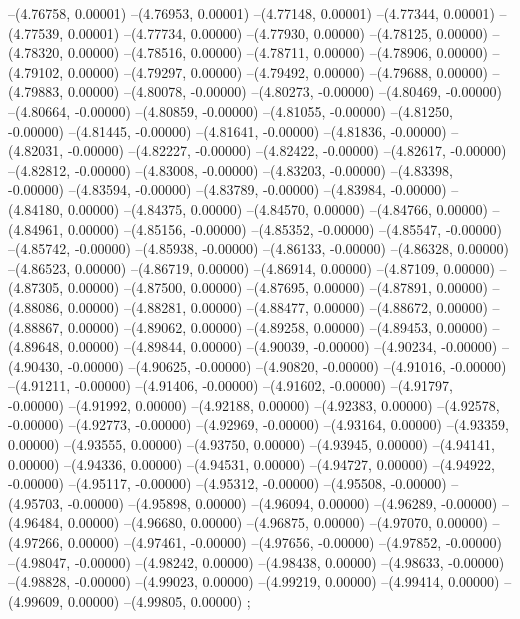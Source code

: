 --(4.76758, 0.00001)
--(4.76953, 0.00001)
--(4.77148, 0.00001)
--(4.77344, 0.00001)
--(4.77539, 0.00001)
--(4.77734, 0.00000)
--(4.77930, 0.00000)
--(4.78125, 0.00000)
--(4.78320, 0.00000)
--(4.78516, 0.00000)
--(4.78711, 0.00000)
--(4.78906, 0.00000)
--(4.79102, 0.00000)
--(4.79297, 0.00000)
--(4.79492, 0.00000)
--(4.79688, 0.00000)
--(4.79883, 0.00000)
--(4.80078, -0.00000)
--(4.80273, -0.00000)
--(4.80469, -0.00000)
--(4.80664, -0.00000)
--(4.80859, -0.00000)
--(4.81055, -0.00000)
--(4.81250, -0.00000)
--(4.81445, -0.00000)
--(4.81641, -0.00000)
--(4.81836, -0.00000)
--(4.82031, -0.00000)
--(4.82227, -0.00000)
--(4.82422, -0.00000)
--(4.82617, -0.00000)
--(4.82812, -0.00000)
--(4.83008, -0.00000)
--(4.83203, -0.00000)
--(4.83398, -0.00000)
--(4.83594, -0.00000)
--(4.83789, -0.00000)
--(4.83984, -0.00000)
--(4.84180, 0.00000)
--(4.84375, 0.00000)
--(4.84570, 0.00000)
--(4.84766, 0.00000)
--(4.84961, 0.00000)
--(4.85156, -0.00000)
--(4.85352, -0.00000)
--(4.85547, -0.00000)
--(4.85742, -0.00000)
--(4.85938, -0.00000)
--(4.86133, -0.00000)
--(4.86328, 0.00000)
--(4.86523, 0.00000)
--(4.86719, 0.00000)
--(4.86914, 0.00000)
--(4.87109, 0.00000)
--(4.87305, 0.00000)
--(4.87500, 0.00000)
--(4.87695, 0.00000)
--(4.87891, 0.00000)
--(4.88086, 0.00000)
--(4.88281, 0.00000)
--(4.88477, 0.00000)
--(4.88672, 0.00000)
--(4.88867, 0.00000)
--(4.89062, 0.00000)
--(4.89258, 0.00000)
--(4.89453, 0.00000)
--(4.89648, 0.00000)
--(4.89844, 0.00000)
--(4.90039, -0.00000)
--(4.90234, -0.00000)
--(4.90430, -0.00000)
--(4.90625, -0.00000)
--(4.90820, -0.00000)
--(4.91016, -0.00000)
--(4.91211, -0.00000)
--(4.91406, -0.00000)
--(4.91602, -0.00000)
--(4.91797, -0.00000)
--(4.91992, 0.00000)
--(4.92188, 0.00000)
--(4.92383, 0.00000)
--(4.92578, -0.00000)
--(4.92773, -0.00000)
--(4.92969, -0.00000)
--(4.93164, 0.00000)
--(4.93359, 0.00000)
--(4.93555, 0.00000)
--(4.93750, 0.00000)
--(4.93945, 0.00000)
--(4.94141, 0.00000)
--(4.94336, 0.00000)
--(4.94531, 0.00000)
--(4.94727, 0.00000)
--(4.94922, -0.00000)
--(4.95117, -0.00000)
--(4.95312, -0.00000)
--(4.95508, -0.00000)
--(4.95703, -0.00000)
--(4.95898, 0.00000)
--(4.96094, 0.00000)
--(4.96289, -0.00000)
--(4.96484, 0.00000)
--(4.96680, 0.00000)
--(4.96875, 0.00000)
--(4.97070, 0.00000)
--(4.97266, 0.00000)
--(4.97461, -0.00000)
--(4.97656, -0.00000)
--(4.97852, -0.00000)
--(4.98047, -0.00000)
--(4.98242, 0.00000)
--(4.98438, 0.00000)
--(4.98633, -0.00000)
--(4.98828, -0.00000)
--(4.99023, 0.00000)
--(4.99219, 0.00000)
--(4.99414, 0.00000)
--(4.99609, 0.00000)
--(4.99805, 0.00000)
;
